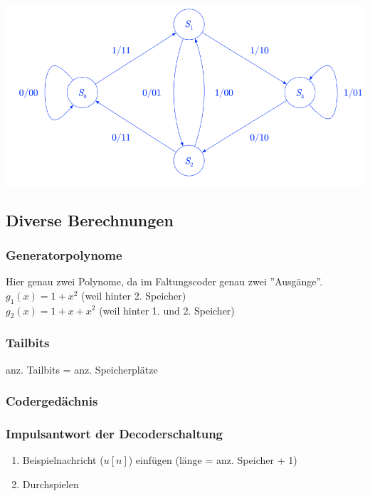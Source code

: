 \vspace{-8pt}
\begin{center}
    \includegraphics[scale=.3]{graphic/faltungscodes/Zustandsdiagramm.png}
\end{center}
\vspace{-8pt}

\subsection{Diverse Berechnungen}

\subsubsection{Generatorpolynome}
Hier genau zwei Polynome, da im Faltungscoder genau zwei ''Ausgänge''.\\
$g_1(x) = 1 + x^2$ (weil hinter 2. Speicher)\\
$g_2(x) = 1 + x + x^2$ (weil hinter 1. und 2. Speicher)

\subsubsection{Tailbits}
anz. Tailbits = anz. Speicherplätze

\subsubsection{Codergedächnis}

\subsubsection{Impulsantwort der Decoderschaltung}
\begin{enumerate}
    \item Beispielnachricht (${u[n]}$) einfügen (länge = anz. Speicher + 1)
    \item Durchspielen
\end{enumerate}

